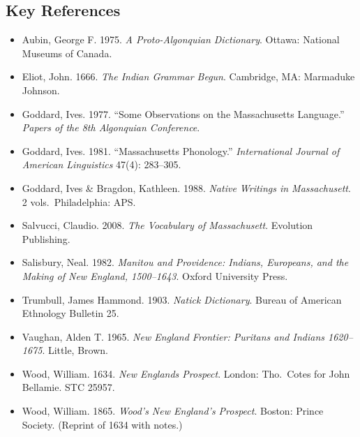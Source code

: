 \subsection{Key References}

\begin{itemize}
  \item Aubin, George F. 1975. \emph{A Proto-Algonquian Dictionary}. Ottawa:
    National Museums of Canada.
  \item Eliot, John. 1666. \emph{The Indian Grammar Begun}. Cambridge, MA:
    Marmaduke Johnson.
  \item Goddard, Ives. 1977. ``Some Observations on the Massachusetts
    Language.'' \emph{Papers of the 8th Algonquian Conference}.
  \item Goddard, Ives. 1981. ``Massachusetts Phonology.'' \emph{International
    Journal of American Linguistics} 47(4): 283--305.
  \item Goddard, Ives \& Bragdon, Kathleen. 1988. \emph{Native Writings in
    Massachusett}. 2 vols.\ Philadelphia: APS.
  \item Salvucci, Claudio. 2008. \emph{The Vocabulary of Massachusett}.
    Evolution Publishing.
  \item Salisbury, Neal. 1982. \emph{Manitou and Providence: Indians, Europeans,
    and the Making of New England, 1500--1643}. Oxford University Press.
  \item Trumbull, James Hammond. 1903. \emph{Natick Dictionary}. Bureau of
    American Ethnology Bulletin 25.
  \item Vaughan, Alden T. 1965. \emph{New England Frontier: Puritans and
    Indians 1620--1675}. Little, Brown.
  \item Wood, William. 1634. \emph{New Englands Prospect}. London: Tho.\ Cotes
    for John Bellamie. STC 25957.
  \item Wood, William. 1865. \emph{Wood's New England's Prospect}. Boston:
    Prince Society. (Reprint of 1634 with notes.)
\end{itemize}
